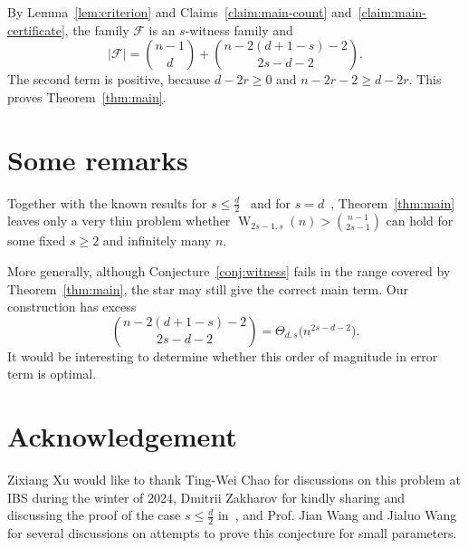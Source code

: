 \documentclass[11pt]{article}
\theoremstyle{definition}
\newcommand{\cF}{\mathcal{F}}
\newcommand{\W}{\operatorname{W}}
\begin{document}
By Lemma~\ref{lem:criterion} and Claims~\ref{claim:main-count} and~\ref{claim:main-certificate}, the family \(\cF\) is an \(s\)-witness family and
\[
|\cF|=\binom{n-1}{d}+\binom{n-2(d+1-s)-2}{2s-d-2}.
\]
The second term is positive, because \(d-2r\ge0\) and \(n-2r-2\ge d-2r\). This proves Theorem~\ref{thm:main}.
\section{Some remarks}
Together with the known results for \(s\le \frac{d}{2}\)~\cite{2026Chao} and for
\(s=d\)~\cite{2025CombProof}, Theorem~\ref{thm:main} leaves only a very thin
problem whether
\(
\W_{2s-1,s}(n)>\binom{n-1}{2s-1}
\)
can hold for some fixed \(s\ge2\) and infinitely many \(n\).

More generally, although Conjecture~\ref{conj:witness} fails in the range
covered by Theorem~\ref{thm:main}, the star may still give the correct main
term. Our construction has excess
\[
\binom{n-2(d+1-s)-2}{2s-d-2}
=\Theta_{d,s}\bigl(n^{2s-d-2}\bigr).
\]
It would be interesting to determine whether this order of magnitude in error term is
optimal.

\section*{Acknowledgement}
Zixiang Xu would like to thank Ting-Wei Chao for discussions on this problem at IBS during the winter of 2024, Dmitrii Zakharov for kindly sharing and discussing the proof of the case \(s\le \frac{d}{2}\) in~\cite{2026Chao}, and Prof. Jian Wang and Jialuo Wang for several discussions on attempts to prove this conjecture for small parameters.




\end{document}
